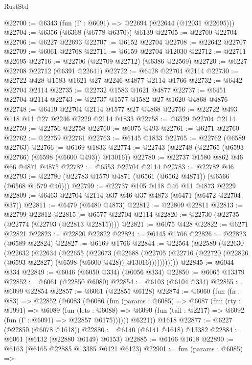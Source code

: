 \begin{lexlean}{RustStd}
\begin{coremodule}
{\begin{coremodule}
{{{{{{{{{{{{{{{{{{{{{{{{{{@22700 := @6343 (fun (Γ : @6091) => @22694 (@22644 (@12031 @22695)))
@22704 := @6356 (@6368 (@6778 @6370)) @6139
@22705 := @22700 @22704
@22706 := @6227 @22693
@22707 := @6152 @22704
@22708 := @22642 @22707
@22709 := @6061 @22708
@22711 := @6159 @22704 @12030
@22712 := @22711 @22695
@22716 := @22706 (@22709 @22712) (@6386 @22569)
@22720 := @6227 @22708 @22712 (@6391 @22641)
@22722 := @6428 @22704 @2114
@22730 := @22722 @428 @1583 @1621 @27 @2246 @4877 @2114 @1766
@22732 := @6442 @22704 @2114
@22735 := @22732 @1583 @1621 @4877
@22737 := @6451 @22704 @2114
@22743 := @22737 @1577 @1582 @27 @1620 @4868 @4876
@22748 := @6419 @22704 @2114 @1577 @27 @4868
@22756 := @22722 @493 @118 @11 @27 @2246 @2229 @2114 @1833
@22758 := @6529 @22704 @2114
@22759 := @22756 @22758
@22760 := @6075 @493
@22761 := @6271 @22760
@22762 := @22759 @22761
@22763 := @6145 @1833
@22765 := @22762 (@6589 @22763)
@22766 := @6169 @1833
@22774 := @22743 (@22748 (@22765 (@6593 @22766) (@6598 (@6600 @493)) @13016))
@22780 := @22737 @1580 @862 @46 @66 @4871 @4875
@22782 := @6553 @22704 @2114
@22783 := @22782 @46
@22793 := @22780 (@22783 @1579 @4871 (@6561 (@6562 @4871)) (@6566 (@6568 @1579 @46)))
@22799 := @22737 @105 @118 @46 @11 @4873 @2229
@22809 := @6463 @22704 @2114 @37 @46 @37 @4873 (@6471 (@6472 @22704 @37))
@22811 := @6479 (@6480 @4873)
@22812 := @22809 @22811
@22813 := @22799 @22812
@22815 := @6577 @22704 @2114
@22820 := @22730 (@22735 (@22774 (@22793 (@22813 @22815))))
@22821 := @6075 @428
@22822 := @6271 @22821
@22823 := @22820 @22822
@22824 := @6145 @1766
@22826 := @22823 (@6589 @22824)
@22827 := @6169 @1766
@22844 := @22564
    (@22589
      (@22630
        (@22632
          (@22634
            (@22655
              (@22673
                (@22688
                  (@22705
                    (@22716 (@22720 (@22826 (@6593 @22827) (@6598 (@6600 @428)) @13016)))))))))))
@22845 := @6044 @334
@22849 := @6046 (@6050 @334) (@6056 @334)
@22850 := @6065 @13379
@22852 := @6061 (@22850 @6080)
@22854 := @6103 (@6104 @334)
@22855 := @6099 @22854
@22857 := @6061 (@22855 @6128)
@22874 := @6060
    (fun (fn : @83) =>
    @22852
      (@6083
        (@6086
          (fun (params : @6085) =>
          @6087
            (fun (rty : @1991) =>
            @6089
              (fun (lets : @6088) =>
              @6090 (fun (tail : @2217) => @6092 (fun (Γ : @6091) => @22857 @6175))))))
        @6221))
    @1618
@22877 := @6227 (@22850 (@6078 @1618))
@22880 := @6140 (@6141 @1618) @13382
@22884 := @6061 (@6132 (@22880 @6149) @6153)
@22885 := @6166 @1618
@22890 := @6163 (@6165 @22885 @13385 @6121 @6123)
@22901 := fun (params : @6085) =>
}}}}}}}}}}}}}}}}}}}}}}}}}}
\end{coremodule}}
\end{coremodule}
\end{lexlean}
